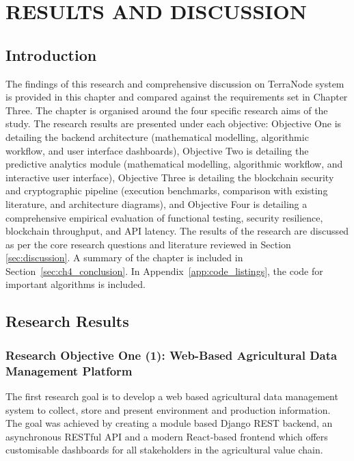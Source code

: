 \chapter{RESULTS AND DISCUSSION}

\section{Introduction}

The findings of this research and comprehensive discussion on TerraNode system is provided in this chapter and compared against the requirements set in Chapter Three. The chapter is organised around the four specific research aims of the study. The research results are presented under each objective: Objective One is detailing the backend architecture (mathematical modelling, algorithmic workflow, and user interface dashboards), Objective Two is detailing the predictive analytics module (mathematical modelling, algorithmic workflow, and interactive user interface), Objective Three is detailing the blockchain security and cryptographic pipeline (execution benchmarks, comparison with existing literature, and architecture diagrams), and Objective Four is detailing a comprehensive empirical evaluation of functional testing, security resilience, blockchain throughput, and API latency. The results of the research are discussed as per the core research questions and literature reviewed in Section \ref{sec:discussion}. A summary of the chapter is included in Section~\ref{sec:ch4_conclusion}. In Appendix~\ref{app:code_listings}, the code for important algorithms is included.

\section{Research Results}
\label{sec:research_results}

\subsection{Research Objective One (1): Web-Based Agricultural Data Management Platform}

The first research goal is to develop a web based agricultural data management system to collect, store and present environment and production information. The goal was achieved by creating a module based Django REST backend, an asynchronous RESTful API and a modern React-based frontend which offers customisable dashboards for all stakeholders in the agricultural value chain.

